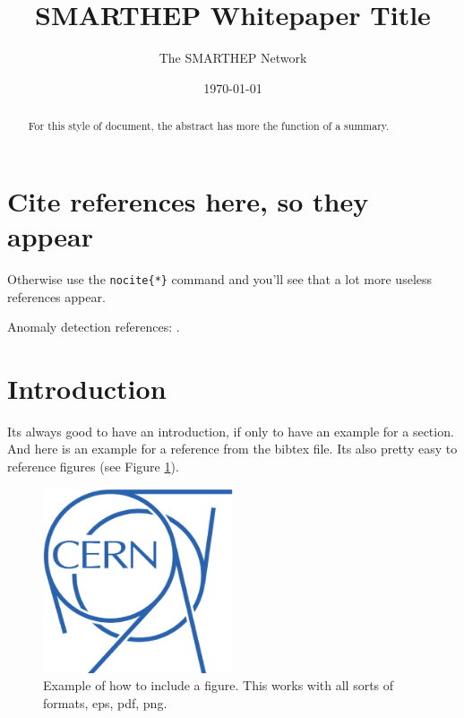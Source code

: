 \documentclass{smarthepnote}
\title{SMARTHEP Whitepaper Title}
\author{The SMARTHEP Network}
\date{\today}
\begin{document}
\maketitle

\begin{abstract}
For this style of document, the abstract has more the function of a summary. 
\end{abstract}

\vfill
\makereviewtable
\clearpage

\section{Cite references here, so they appear}

Otherwise use the \texttt{nocite\{*\}} command and you'll see that a lot more useless references appear. \nocite{*}

Anomaly detection references: \cite{Nachman:2020ccu}. 

\section{Introduction}

Its always good to have an introduction, if only to have an example for a section. And here is an example for a reference from the bibtex file. Its also pretty easy to reference figures (see Figure \ref{fig:examplecernlogo}). \\
\begin{figure}[ht]
\centering
\includegraphics[width=0.5\textwidth]{images/cernlogo.eps}
\caption{\label{fig:examplecernlogo} Example of how to include a figure. This works with all sorts of formats, eps, pdf, png.}
\end{figure}
\end{document}
